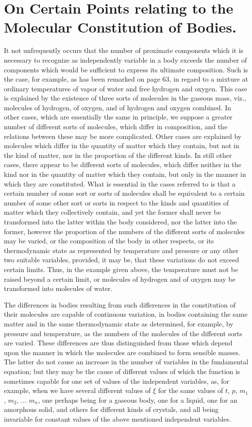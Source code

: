 \documentclass[12pt]{memoir}
\begin{document}
\section{On Certain Points relating to the Molecular Constitution of Bodies.}
It not unfrequently occurs that the number of proximate components which it is necessary to recognize as independently variable in a body exceeds the number of components which would be sufficient to express its ultimate composition. Such is the case, for example, as has been remarked on page 63, in regard to a mixture at ordinary temperatures of vapor of water and free hydrogen and oxygen. This case is explained by the existence of three sorts of molecules in the gaseous mass, viz., molecules of hydrogen, of oxygen, and of hydrogen and oxygen combined. In other cases, which are essentially the same in principle, we suppose a greater number of different sorts of molecules, which differ in composition, and the relations between these may be more complicated.
Other cases are explained by molecules which differ in the quantity of matter which they contain, but not in the kind of matter, nor in the proportion of the different kinds.
In still other cases, there appear to be different sorts of molecules, which differ neither in the kind nor in the quantity of matter which they contain, but only in the manner in which they are constituted. What is essential in the cases referred to is that a certain number of some sort or sorts of molecules shall be equivalent to a certain number of some other sort or sorts in respect to the kinds and quantities of matter which they collectively contain, and yet the former shall never be transformed into the latter within the body considered, nor the latter into the former, however the proportion of the numbers of the different sorts of molecules may be varied, or the composition of the body in other respects, or its thermodynamic state as represented by temperature and pressure or any other two suitable variables, provided, it may be, that these variations do not exceed certain limits. Thus, in the
example given above, the temperature must not be raised beyond a certain limit, or molecules of hydrogen and of oxygen may be transformed into molecules of water.


The differences in bodies resulting from such differences in the constitution of their molecules are capable of continuous variation, in bodies containing the same matter and in the same thermodynamic state as determined, for example, by pressure and temperature, as the numbers of the molecules of the different sorts are varied. These differences are thus distinguished from those which depend upon the manner in which the molecules are combined to form sensible masses. The latter do not cause an increase in the number of variables in the fundamental equation; but they may be the cause of different values of which the function is sometimes capable for one set of values of the independent variables, as, for example, when we have several different values of $\xi$ for the same values of $t$, $p$, $m_1$, $m_2$, ... $m_n$, one perhaps being for a gaseous body, one for a liquid, one for an amorphous solid, and others for different kinds of crystals, and all being invariable for constant values of the above mentioned independent variables.
\end{document}
